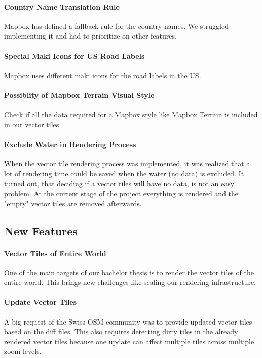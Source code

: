 \paragraph{Country Name Translation Rule}
Mapbox has defined a fallback rule\cite{22_mapbox.com_2015} for the country names. We struggled implementing it and had to prioritize on other features.

\paragraph{Special Maki Icons for US Road Labels}
Mapbox uses different maki icons\cite{101_mapbox.com_2015} for the road labels in the US.  

\paragraph{Possiblity of Mapbox Terrain Visual Style}
Check if all the data required for a Mapbox style like Mapbox Terrain\cite{102_mapbox.com_2015} is included in our vector tiles

\paragraph{Exclude Water in Rendering Process}

When the vector tile rendering process was implemented, it was realized that a lot of rendering time could be saved
when the water (no data) is excluded.
It turned out, that deciding if a vector tiles will have no data, is not an easy problem. At the current stage of the project
everything is rendered and the "empty" vector tiles are removed afterwards.

\subsection{New Features}\label{new_features}

\paragraph{Vector Tiles of Entire World}
One of the main targets of our bachelor thesis is to render the vector tiles of the entire world. This brings new challenges like scaling our rendering infrastructure. 

\paragraph{Update Vector Tiles}
A big request of the Swiss OSM community was to provide updated vector tiles based on the diff\cite{103_wiki.openstreetmap.org_2015} files.
This also requires detecting dirty tiles in the already rendered vector tiles because one update can affect multiple tiles across multiple zoom levels.


